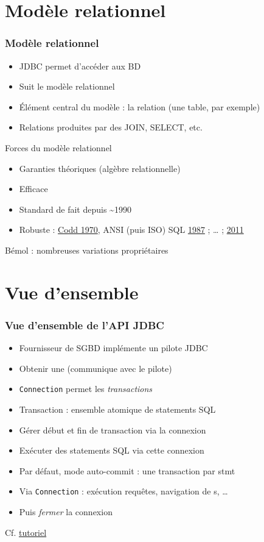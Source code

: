 \documentclass[english, french]{beamer}
\begin{document}
\section{Modèle relationnel}
\begin{frame}
	\frametitle{Modèle relationnel}
	\begin{itemize}
		\item JDBC permet d’accéder aux BD
		\item Suit le modèle relationnel
		\item Élément central du modèle : la relation (une table, par exemple)
		\item Relations produites par des JOIN, SELECT, etc.
	\end{itemize}
	\begin{block}{Forces du modèle relationnel}
		\pause
		\begin{itemize}
			\item Garanties théoriques (algèbre relationnelle)
			\item Efficace
			\item Standard de fait depuis \textasciitilde 1990
			\item Robuste : \href{https://dl.acm.org/doi/10.1145/362384.362685}{Codd 1970}, ANSI (puis ISO) SQL \href{https://www.iso.org/iso/home/store/catalogue_ics/catalogue_detail_ics.htm?csnumber=16661}{1987} ; … ; \href{https://www.iso.org/iso/home/store/catalogue_ics/catalogue_detail_ics.htm?csnumber=53681}{2011}
		\end{itemize}
	\end{block}
	Bémol : nombreuses variations propriétaires
\end{frame}

\section{Vue d’ensemble}
\begin{frame}
	\frametitle{Vue d’ensemble de l’API JDBC}
	\begin{itemize}
		\item Fournisseur de SGBD implémente un pilote JDBC
		\item Obtenir une  (communique avec le pilote)
		\item \texttt{Connection} permet les \emph{transactions}
		\item Transaction : ensemble atomique de \og{}statements\fg{} SQL
		\item Gérer début et fin de transaction via la connexion
		\item Exécuter des statements SQL via cette connexion
		\item Par défaut, mode auto-commit : une transaction par stmt
		\item Via \texttt{Connection} : exécution requêtes, navigation de s, …
		\item Puis \emph{fermer} la connexion
	\end{itemize}
	Cf. \href{https://docs.oracle.com/javase/tutorial/jdbc/}{tutoriel}
\end{frame}
\end{document}
